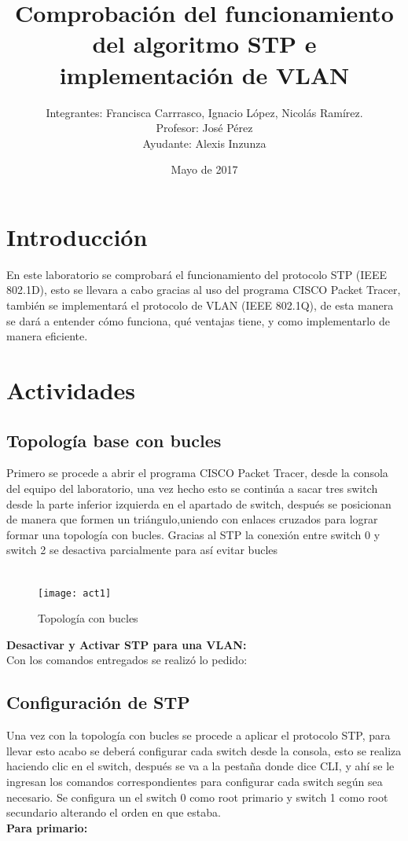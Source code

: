 \documentclass{udpreport}
\title{Comprobación del funcionamiento del algoritmo STP e implementación de VLAN}
\author{Integrantes: Francisca Carrrasco, Ignacio López, Nicolás Ramírez.\\Profesor: José Pérez
\\Ayudante: Alexis Inzunza}
\date{Mayo de 2017}
\begin{document}
\maketitle
\tableofcontents
\listoffigures
\chapter{Introducción}
  En este laboratorio se comprobará el funcionamiento del protocolo STP (IEEE 802.1D),  esto se llevara a cabo gracias al uso del programa CISCO Packet Tracer, también se implementará el protocolo de  VLAN (IEEE 802.1Q), de esta manera se dará a entender cómo funciona, qué  ventajas tiene, y como implementarlo de manera eficiente.
  	
  \vfill
  
\chapter{Actividades}
	\section{Topología base con bucles}
	Primero se procede a abrir el programa CISCO Packet Tracer, desde la consola del equipo del laboratorio, una vez hecho esto se
	continúa a sacar tres switch desde la parte inferior izquierda en el apartado de switch, después se posicionan de manera que
	formen un triángulo,uniendo con enlaces cruzados para lograr formar una topología con bucles. Gracias al STP la conexión entre switch 0 y switch 2 se desactiva parcialmente para así evitar bucles \\\\
	\begin{figure}[H]
    \centering
    \texttt{[image: act1]} %
    \caption{Topología con bucles}
    \end{figure}
    	{\large \bf{Desactivar y Activar STP para una VLAN: }}\\
    	Con los comandos entregados se realizó lo pedido:
    	
    
	\section{Configuración de STP}
	Una vez con la topología con bucles se procede a aplicar el protocolo STP, para llevar esto acabo se deberá configurar cada
	switch desde la consola, esto se realiza haciendo clic en el switch, después se va a la pestaña donde dice CLI, y ahí se le
	ingresan los comandos correspondientes para configurar cada switch según sea necesario. Se configura un el switch 0 como root primario y switch 1 como root secundario alterando el orden en que estaba.\\
	{\large \bf{Para primario: }}\\
	
\end{document}
